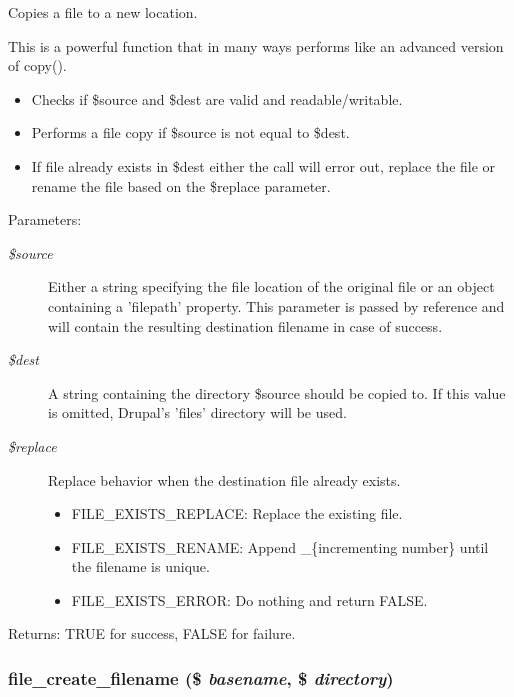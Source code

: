 Copies a file to a new location.

This is a powerful function that in many ways performs like an advanced version of copy().\begin{itemize}
\item Checks if \$source and \$dest are valid and readable/writable.\item Performs a file copy if \$source is not equal to \$dest.\item If file already exists in \$dest either the call will error out, replace the file or rename the file based on the \$replace parameter.\end{itemize}


\begin{Desc}
\item[Parameters:]
\begin{description}
\item[{\em \$source}]Either a string specifying the file location of the original file or an object containing a 'filepath' property. This parameter is passed by reference and will contain the resulting destination filename in case of success. \item[{\em \$dest}]A string containing the directory \$source should be copied to. If this value is omitted, Drupal's 'files' directory will be used. \item[{\em \$replace}]Replace behavior when the destination file already exists.\begin{itemize}
\item FILE\_\-EXISTS\_\-REPLACE: Replace the existing file.\item FILE\_\-EXISTS\_\-RENAME: Append \_\-\{incrementing number\} until the filename is unique.\item FILE\_\-EXISTS\_\-ERROR: Do nothing and return FALSE. \end{itemize}
\end{description}
\end{Desc}
\begin{Desc}
\item[Returns:]TRUE for success, FALSE for failure. \end{Desc}
\hypertarget{group__file_g057bbfa5f89c4e4c75f0030e6f1f3809}{
\subsubsection[{file\_\-create\_\-filename}]{\setlength{\rightskip}{0pt plus 5cm}file\_\-create\_\-filename (\$ {\em basename}, \/  \$ {\em directory})}}
\label{group__file_g057bbfa5f89c4e4c75f0030e6f1f3809}


